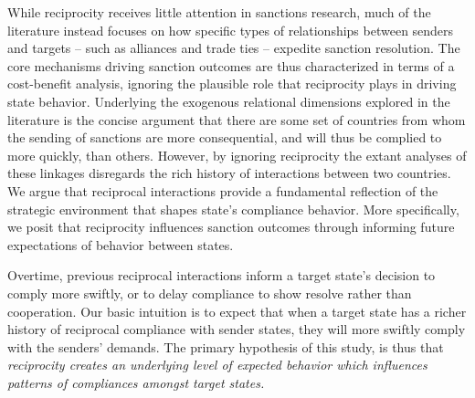While reciprocity receives little attention in sanctions research, much of the literature instead focuses on how specific types of relationships between senders and targets -- such as alliances and trade ties -- expedite sanction resolution. The core mechanisms driving sanction outcomes are thus characterized in terms of a cost-benefit analysis, ignoring the plausible role that reciprocity plays in driving state behavior. Underlying the exogenous relational dimensions explored in the literature is the concise argument that there are some set of countries from whom the sending of sanctions are more consequential, and will thus be complied to more quickly, than others. However, by ignoring reciprocity the extant analyses of these linkages disregards the rich history of interactions between two countries. We argue that reciprocal interactions provide a fundamental reflection of the strategic environment that shapes state's compliance behavior. More specifically, we posit that reciprocity influences sanction outcomes through informing future expectations of behavior between states. 


Overtime, previous reciprocal interactions inform a target state's decision to comply more swiftly, or to delay compliance to show resolve rather than cooperation. Our basic intuition is to expect that when a target state has a richer history of reciprocal compliance with sender states, they will more swiftly comply with the senders' demands. The primary hypothesis of this study, is thus that \textit{reciprocity creates an underlying level of expected behavior which influences patterns of compliances amongst target states.}

